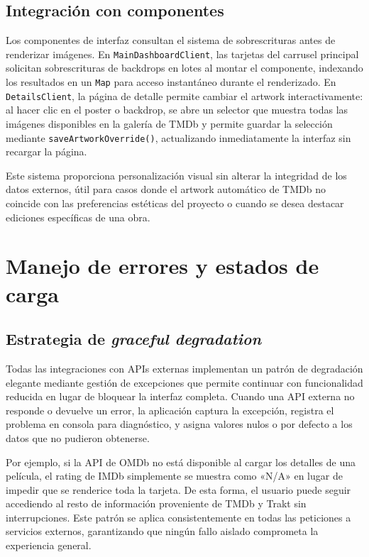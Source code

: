 \subsection{Integración con componentes}

Los componentes de interfaz consultan el sistema de sobrescrituras antes de renderizar imágenes. En \texttt{MainDashboardClient}, las tarjetas del carrusel principal solicitan sobrescrituras de backdrops en lotes al montar el componente, indexando los resultados en un \texttt{Map} para acceso instantáneo durante el renderizado. En \texttt{DetailsClient}, la página de detalle permite cambiar el artwork interactivamente: al hacer clic en el poster o backdrop, se abre un selector que muestra todas las imágenes disponibles en la galería de TMDb y permite guardar la selección mediante \texttt{saveArtworkOverride()}, actualizando inmediatamente la interfaz sin recargar la página.

Este sistema proporciona personalización visual sin alterar la integridad de los datos externos, útil para casos donde el artwork automático de TMDb no coincide con las preferencias estéticas del proyecto o cuando se desea destacar ediciones específicas de una obra.

\section{Manejo de errores y estados de carga}

\subsection{Estrategia de \textit{graceful degradation}}

Todas las integraciones con APIs externas implementan un patrón de degradación elegante mediante gestión de excepciones que permite continuar con funcionalidad reducida en lugar de bloquear la interfaz completa. Cuando una API externa no responde o devuelve un error, la aplicación captura la excepción, registra el problema en consola para diagnóstico, y asigna valores nulos o por defecto a los datos que no pudieron obtenerse. 

Por ejemplo, si la API de OMDb no está disponible al cargar los detalles de una película, el rating de IMDb simplemente se muestra como «N/A» en lugar de impedir que se renderice toda la tarjeta. De esta forma, el usuario puede seguir accediendo al resto de información proveniente de TMDb y Trakt sin interrupciones. Este patrón se aplica consistentemente en todas las peticiones a servicios externos, garantizando que ningún fallo aislado comprometa la experiencia general.

